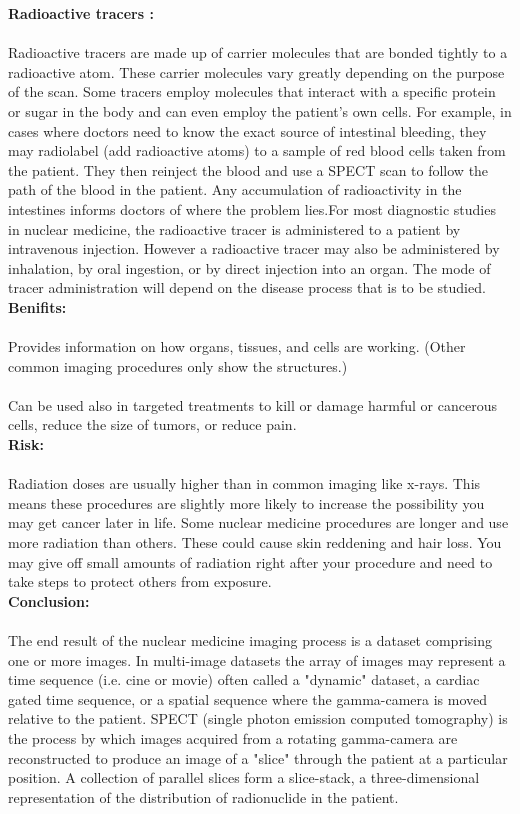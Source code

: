 \documentclass[12pt]{article}
\begin{document}
\noindent \textbf{\large Radioactive tracers :}\\ \\ Radioactive tracers are made up of carrier molecules that are bonded tightly to a radioactive atom. These carrier molecules vary greatly depending on the purpose of the scan. Some tracers employ molecules that interact with a specific protein or sugar in the body and can even employ the patient’s own cells. For example, in cases where doctors need to know the exact source of intestinal bleeding, they may radiolabel (add radioactive atoms) to a sample of red blood cells taken from the patient. They then reinject the blood and use a SPECT scan to follow the path of the blood in the patient. Any accumulation of radioactivity in the intestines informs doctors of where the problem lies.For most diagnostic studies in nuclear medicine, the radioactive tracer is administered to a patient by intravenous injection. However a radioactive tracer may also be administered by inhalation, by oral ingestion, or by direct injection into an organ. The mode of tracer administration will depend on the disease process that is to be studied.\\

\noindent \textbf{\large Benifits:}\\ \\ Provides information on how organs, tissues, and cells are working. (Other common imaging procedures only show the structures.) \\
\\ Can be used also in targeted treatments to kill or damage harmful or cancerous cells, reduce the size of tumors, or reduce pain.\\

\noindent \textbf{\large Risk:} \\ \\ Radiation doses are usually higher than in common imaging like x-rays. This means these procedures are slightly more likely to increase the possibility you may get cancer later in life.
Some nuclear medicine procedures are longer and use more radiation than others. These could cause skin reddening and hair loss.
You may give off small amounts of radiation right after your procedure and need to take steps to protect others from exposure.\\

\noindent \textbf{\large Conclusion:} \\ \\ The end result of the nuclear medicine imaging process is a dataset comprising one or more images. In multi-image datasets the array of images may represent a time sequence (i.e. cine or movie) often called a "dynamic" dataset, a cardiac gated time sequence, or a spatial sequence where the gamma-camera is moved relative to the patient. SPECT (single photon emission computed tomography) is the process by which images acquired from a rotating gamma-camera are reconstructed to produce an image of a "slice" through the patient at a particular position. A collection of parallel slices form a slice-stack, a three-dimensional representation of the distribution of radionuclide in the patient.\\ \\ 
\end{document}

